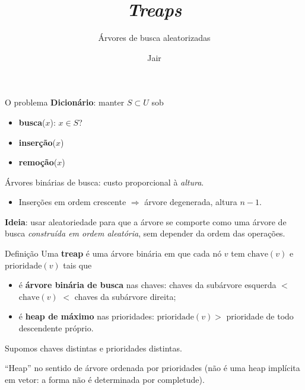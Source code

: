 \documentclass[aspectratio=169,11pt]{beamer}
\title{\textit{Treaps}}
\subtitle{Árvores de busca aleatorizadas}
\author{Jair}
\institute{UFABC}
\date{}
\newcommand{\define}[1]{\textbf{#1}}
\theoremstyle{definition}
\begin{document}
\begin{frame}
  \titlepage
\end{frame}

\begin{frame}{O problema}
  \textbf{Dicionário}: manter $S\subset U$ sob
  \begin{itemize}
  \item \textbf{busca}($x$): $x\in S$?
  \item \textbf{inserção}($x$)
  \item \textbf{remoção}($x$)
  \end{itemize}
  \pause
  \vspace{1ex}
  Árvores binárias de busca: custo proporcional à \emph{altura}.
  \begin{itemize}
  \item Inserções em ordem crescente $\Rightarrow$ árvore degenerada,
    altura $n-1$.
  \end{itemize}
  \pause
  \vspace{1ex}
  \textbf{Ideia}: usar aleatoriedade para que a árvore se comporte como
  uma árvore de busca \emph{construída em ordem aleatória}, sem
  depender da ordem das operações.
\end{frame}

\begin{frame}{Definição}
  Uma \define{treap} é uma árvore binária em que cada nó $v$ tem
  $\mathrm{chave}(v)$ e $\mathrm{prioridade}(v)$ tais que
  \begin{itemize}
  \item é \textbf{árvore binária de busca} nas chaves:
    chaves da subárvore esquerda $<$ $\mathrm{chave}(v)$ $<$ chaves da
    subárvore direita;
  \item é \textbf{heap de máximo} nas prioridades:
    $\mathrm{prioridade}(v)>$ prioridade de todo descendente próprio.
  \end{itemize}
  \vspace{1ex}
  Supomos chaves distintas e prioridades distintas.

  \medskip
  \small
  ``Heap'' no sentido de árvore ordenada por prioridades (não é uma
  heap implícita em vetor: a forma não é determinada por completude).
\end{frame}
\end{document}

